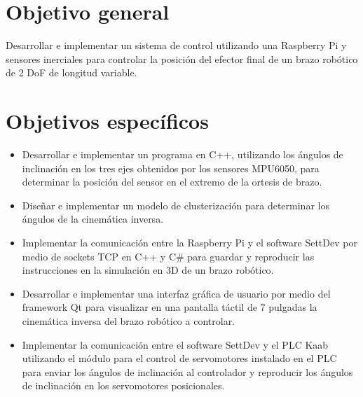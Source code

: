 \section{Objetivo general}

Desarrollar e implementar un sistema de control utilizando una Raspberry Pi y sensores inerciales para controlar la posición del efector final de un brazo robótico de 2 DoF de longitud variable.

\newpage
\section{Objetivos específicos}
\begin{itemize}
	
	\item Desarrollar e implementar un programa en C++, utilizando los ángulos de inclinación en los tres ejes obtenidos por los sensores MPU6050, para determinar la posición del sensor en el extremo de la ortesis de brazo.
	
	\item Diseñar e implementar un modelo de clusterización para determinar los ángulos de la cinemática inversa.
	
	\item Implementar la comunicación entre la Raspberry Pi y el software SettDev por medio de sockets TCP en C++ y C\# para guardar y reproducir las instrucciones en la simulación en 3D de un brazo robótico.
	
	\item Desarrollar e implementar una interfaz gráfica de usuario por medio del framework Qt para visualizar en una pantalla táctil de 7 pulgadas la cinemática inversa del brazo robótico a controlar.
	
	\item Implementar la comunicación entre el software SettDev y el PLC Kaab utilizando el módulo para el control de servomotores instalado en el PLC para enviar los ángulos de inclinación al controlador y reproducir los ángulos de inclinación en los servomotores posicionales.
	
\end{itemize}
